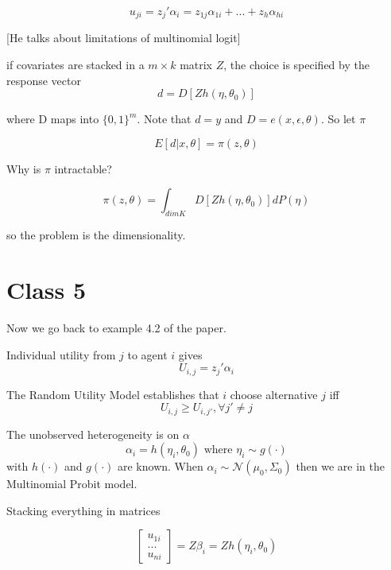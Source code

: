 \documentclass[12pt]{article}
\begin{document}
\begin{equation*}
	u_{ji} = z_j' \alpha_i = z_{1j} \alpha_{1i} + ... + z_h \alpha_{hi}
\end{equation*}

[He talks about limitations of multinomial logit]

if covariates are stacked in a $m \times k$ matrix $Z$, the choice is specified by the response vector
\begin{equation*}
	d = D[Z h(\eta, \theta_0)]
\end{equation*}

where D maps into $\{0,1\}^m$. Note that $d = y$ and $D = e(x,\epsilon,\theta)$. So let $\pi$

\begin{equation*}
	E[d|x, \theta] = \pi(z, \theta)
\end{equation*} 

Why is $\pi$ intractable? 

\begin{equation*}
	\pi(z, \theta) = \int_{dimK} D[Zh(\eta, \theta_0)] dP(\eta)
\end{equation*} 

so the problem is the dimensionality. 

\section*{Class 5}

Now we go back to example 4.2 of the paper. 

Individual utility from $j$ to agent $i$ gives
\begin{equation*}
	U_{i,j} = z_j' \alpha_i
\end{equation*}

The Random Utility Model establishes that $i$ choose alternative $j$ iff
\begin{equation*}
	U_{i,j} \geq U_{i,j'}, \forall j' \neq j
\end{equation*}

The unobserved heterogeneity is on $\alpha$
\begin{equation*}
	\alpha_i = h(\eta_i , \theta_0) \text{ where } \eta_i \sim g(\cdot)
\end{equation*}
with $h(\cdot)$ and $g(\cdot)$ are known. When $\alpha_i \sim \mathcal{N}(\mu_0, \Sigma_0)$ then we are in the Multinomial Probit model. 

Stacking everything in matrices 

\begin{equation*}
	\left[ \begin{matrix}
		u_{1i} \\
		...\\
		u_{ni}
	\end{matrix} \right] = Z \beta_i = Zh(\eta_i,\theta_0)
\end{equation*}
\end{document}
